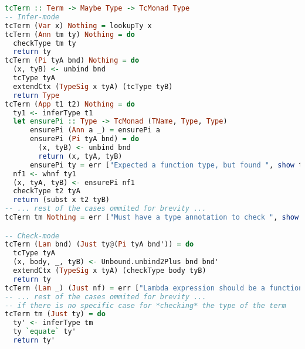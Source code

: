 \documentclass[12pt]{article}
\theoremstyle{definition}
\begin{document}
\newpage
\begin{lstlisting}[language=Haskell]
tcTerm :: Term -> Maybe Type -> TcMonad Type
-- Infer-mode
tcTerm (Var x) Nothing = lookupTy x
tcTerm (Ann tm ty) Nothing = do
  checkType tm ty
  return ty
tcTerm (Pi tyA bnd) Nothing = do
  (x, tyB) <- unbind bnd
  tcType tyA
  extendCtx (TypeSig x tyA) (tcType tyB)
  return Type
tcTerm (App t1 t2) Nothing = do
  ty1 <- inferType t1
  let ensurePi :: Type -> TcMonad (TName, Type, Type)
      ensurePi (Ann a _) = ensurePi a
      ensurePi (Pi tyA bnd) = do
        (x, tyB) <- unbind bnd
        return (x, tyA, tyB)
      ensurePi ty = err ["Expected a function type, but found ", show ty]
  nf1 <- whnf ty1
  (x, tyA, tyB) <- ensurePi nf1
  checkType t2 tyA
  return (subst x t2 tyB)
-- ... rest of the cases ommited for brevity ...
tcTerm tm Nothing = err ["Must have a type annotation to check ", show tm]

-- Check-mode
tcTerm (Lam bnd) (Just ty@(Pi tyA bnd')) = do
  tcType tyA
  (x, body, _, tyB) <- Unbound.unbind2Plus bnd bnd'
  extendCtx (TypeSig x tyA) (checkType body tyB)
  return ty
tcTerm (Lam _) (Just nf) = err ["Lambda expression should be a function"]
-- ... rest of the cases ommited for brevity ...
-- if there is no specific case for *checking* the type of the term
tcTerm tm (Just ty) = do
  ty' <- inferType tm
  ty `equate` ty'
  return ty'
\end{lstlisting}

\newpage
\end{document}
